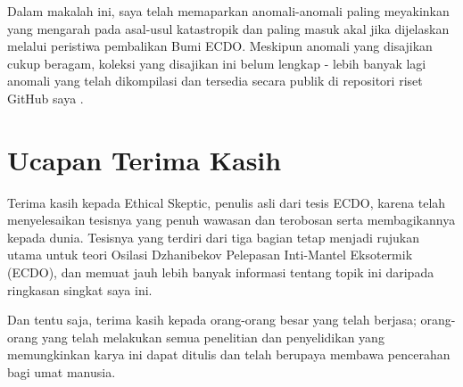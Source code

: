 \documentclass[10pt,twocolumn,letterpaper]{article}
\begin{document}
Dalam makalah ini, saya telah memaparkan anomali-anomali paling meyakinkan yang mengarah pada asal-usul katastropik dan paling masuk akal jika dijelaskan melalui peristiwa pembalikan Bumi ECDO. Meskipun anomali yang disajikan cukup beragam, koleksi yang disajikan ini belum lengkap - lebih banyak lagi anomali yang telah dikompilasi dan tersedia secara publik di repositori riset GitHub saya \cite{2}.

\section{Ucapan Terima Kasih}

Terima kasih kepada Ethical Skeptic, penulis asli dari tesis ECDO, karena telah menyelesaikan tesisnya yang penuh wawasan dan terobosan serta membagikannya kepada dunia. Tesisnya yang terdiri dari tiga bagian \cite{1} tetap menjadi rujukan utama untuk teori Osilasi Dzhanibekov Pelepasan Inti-Mantel Eksotermik (ECDO), dan memuat jauh lebih banyak informasi tentang topik ini daripada ringkasan singkat saya ini.

Dan tentu saja, terima kasih kepada orang-orang besar yang telah berjasa; orang-orang yang telah melakukan semua penelitian dan penyelidikan yang memungkinkan karya ini dapat ditulis dan telah berupaya membawa pencerahan bagi umat manusia.

\clearpage
\twocolumn

{\small


}
\end{document}
